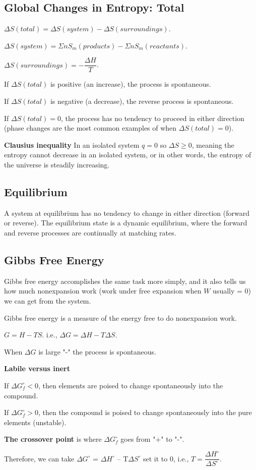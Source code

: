 \documentclass[a4paper,12pt]{article}
\begin{document}
\subsection{Global Changes in Entropy: Total}
$\Delta S(total)=\Delta S (system)-\Delta S(surroundings)$.\par
$\Delta S(system)=\Sigma nS_{m}(products)-\Sigma nS_{m}(reactants)$.\par
$\Delta S(surroundings)=-\dfrac{\Delta H}{T}$.\par
If $\Delta S(total)$ is positive (an increase), the process is spontaneous.\par
If $\Delta S(total)$ is negative (a decrease), the reverse process is spontaneous.\par
If $\Delta S(total) = 0$, the process has no tendency to proceed in either direction (phase changes are the most common examples of when $\Delta S(total) = 0$).\par
\textbf{Clausius inequality} In an isolated system $q=0$ so $\Delta S\geq0$, meaning the entropy cannot decrease in an isolated system, or in other words, the entropy of the universe is steadily increasing.
\subsection{Equilibrium}
A system at equilibrium has no tendency to change in either direction (forward or reverse).
The equilibrium state is a dynamic equilibrium, where the forward and reverse processes are continually at matching rates.
\subsection{Gibbs Free Energy}
Gibbs free energy accomplishes the same task more simply, and it also tells us how much nonexpansion work (work under free expansion when $W$ usually = 0) we can get from the system.\par
Gibbs free energy is a measure of the energy free to do nonexpansion work.\par
$G = H - TS$. i.e., $\Delta G =\Delta H - T\Delta S$.\par
When $\Delta G$ is large "-" the process is spontaneous.\par
\textbf{Labile versus inert}\par
If $\Delta G_{f}^{\circ}<0$, then elements are poised to change spontaneously into the compound.\par
If $\Delta G_{f}^{\circ}>0$, then the compound is poised to change spontaneously into the pure elements (unstable).\par
\textbf{The crossover point} is where $\Delta G_{f}^{\circ}$ goes from "+" to "-".\par Therefore, we can take $\Delta G^{\circ}$ = $\Delta H^{\circ}$ – T$\Delta S^{\circ}$ set it to 0, i.e., $T=\dfrac{\Delta H^{\circ}}{\Delta S^{\circ}}$.
\end{document}
